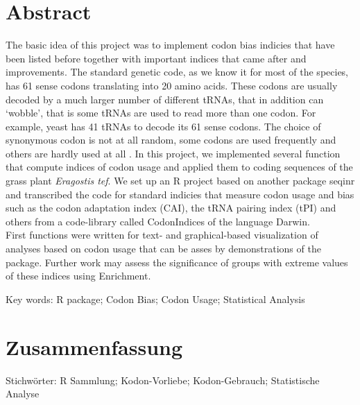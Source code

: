 

\cleardoublepage
\chapter*{Abstract}
The basic idea of this project was to implement codon bias indicies that have been listed before \cite{BinderCh13} together with important indices that came after and improvements. 
The standard genetic code, as we know it for most of the species, has 61 sense codons translating into 20 amino acids. These codons are usually decoded by a much larger number of different tRNAs, that in addition can ‘wobble’, that is some tRNAs are used to read more than one codon. For example, yeast has 41 tRNAs to decode its 61 sense codons. The choice of synonymous codon is not at all random, some codons are used frequently and others are hardly used at all \cite{Cannarozzi2010}. In this project, we implemented several function that compute indices of codon usage and applied them to coding sequences of the grass plant \textit{Eragostis tef}. We set up an R project based on another package seqinr and transcribed the code for standard indicies that measure codon usage and bias such as the codon adaptation index (CAI), the tRNA pairing index (tPI) and others from a code-library called CodonIndices of the language Darwin.\\
First functions were written for text- and graphical-based visualization of analyses based on codon usage that can be asses by demonstrations of the package. Further work may assess the significance of groups with extreme values of these indices using Enrichment.\\

\lipsum[1]

\vskip0.5cm
Key words: 
R package; Codon Bias; Codon Usage; Statistical Analysis



\cleardoublepage
\chapter*{Zusammenfassung}
\lipsum[1-2]
\vskip0.5cm
Stichwörter: 
R Sammlung; Kodon-Vorliebe; Kodon-Gebrauch; Statistische Analyse








